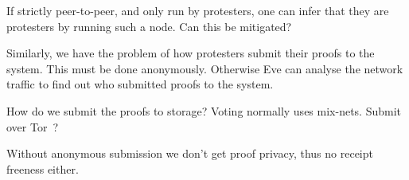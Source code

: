 \begin{question}
  If strictly peer-to-peer, and only run by protesters, one can infer that 
  they are protesters by running such a node.
  Can this be mitigated?
\end{question}

Similarly, we have the problem of how protesters submit their proofs to the 
system.
This must be done anonymously.
Otherwise Eve can analyse the network traffic to find out who submitted proofs 
to the system.

\begin{frame}
  \begin{question}
    How do we submit the proofs to storage?
    Voting normally uses mix-nets.
    Submit over Tor~\cite{Tor}?
  \end{question}

  \begin{remark}
    Without anonymous submission we don't get proof privacy, thus no receipt 
    freeness either.
  \end{remark}
\end{frame}

